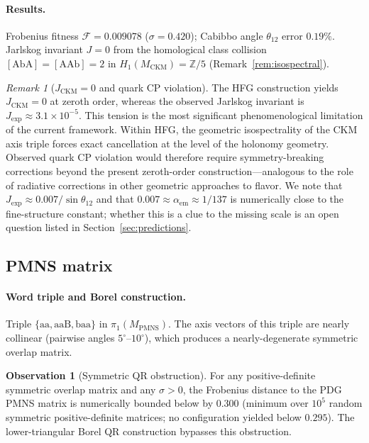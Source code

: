\documentclass[11pt,a4paper]{article}
\theoremstyle{definition}
\newtheorem{observation}[theorem]{Observation}
\theoremstyle{remark}
\newtheorem{remark}[theorem]{Remark}
\newcommand{\ZZ}{\mathbb{Z}}
\newcommand{\MPMNS}{M_{\mathrm{PMNS}}}
\newcommand{\MCKM}{M_{\mathrm{CKM}}}
\begin{document}
\paragraph{Results.}
Frobenius fitness $\mathcal{F}=0.009078$ ($\sigma=0.420$);
Cabibbo angle $\theta_{12}$ error $0.19\%$.
Jarlskog invariant $J=0$ from the homological class collision
$[\mathrm{AbA}]=[\mathrm{AAb}]=2$ in $H_1(\MCKM)=\ZZ/5$
(Remark~\ref{rem:isospectral}).

\begin{remark}[$J_\mathrm{CKM}=0$ and quark CP violation]
\label{rem:jckm}
The HFG construction yields $J_\mathrm{CKM}=0$ at zeroth order,
whereas the observed Jarlskog invariant is
$J_\mathrm{exp}\approx3.1\times10^{-5}$.
This tension is the most significant phenomenological limitation
of the current framework.
Within HFG, the geometric isospectrality of the CKM axis triple
forces exact cancellation at the level of the holonomy geometry.
Observed quark CP violation would therefore require
symmetry-breaking corrections beyond the present zeroth-order
construction---analogous to the role of radiative corrections
in other geometric approaches to flavor.
We note that $J_\mathrm{exp} \approx 0.007/\sin\theta_{12}$
and that $0.007 \approx \alpha_\mathrm{em} \approx 1/137$
is numerically close to the fine-structure constant;
whether this is a clue to the missing scale is an open question
listed in Section~\ref{sec:predictions}.
\end{remark}

\subsection{PMNS matrix}

\paragraph{Word triple and Borel construction.}
Triple $\{\mathrm{aa},\mathrm{aaB},\mathrm{baa}\}$
in $\pi_1(\MPMNS)$.
The axis vectors of this triple are nearly collinear
(pairwise angles $5^\circ$--$10^\circ$), which produces a
nearly-degenerate symmetric overlap matrix.

\begin{observation}[Symmetric QR obstruction]
\label{obs:obstruction}
For any positive-definite symmetric overlap matrix and any
$\sigma>0$, the Frobenius distance to the PDG PMNS matrix is
numerically bounded below by $0.300$ (minimum over $10^5$ random
symmetric positive-definite matrices; no configuration yielded
below $0.295$).
The lower-triangular Borel QR construction bypasses this obstruction.
\end{observation}
\end{document}
